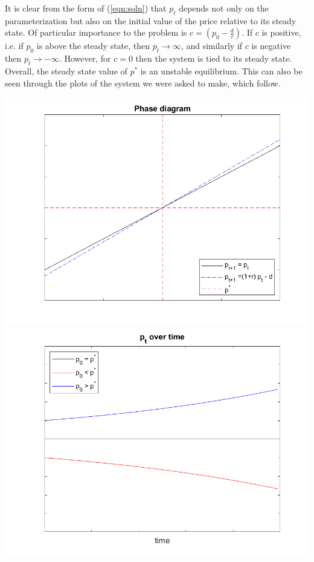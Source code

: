 \documentclass[11pt]{article} %
\begin{document}
It is clear from the form of (\ref{eqn:soln}) that $p_t$ depends not only on the parameterization but also on the initial value of the price relative to its steady state. Of particular importance to the problem is $c = \left( p_0 - \frac{d}{r} \right).$ If $c$ is positive, i.e. if $p_0$ is above the steady state, then $p_{t} \rightarrow \infty$, and similarly if $c$ is negative then $p_{t} \rightarrow -\infty$. However, for $c = 0$ then the system is tied to its steady state. Overall, the steady state value of $p^{*}$ is an unstable equilibrium. This can also be seen through the plots of the system we were asked to make, which follow.

\includegraphics{phase} \\
\includegraphics{pttime} \\
\end{document}
